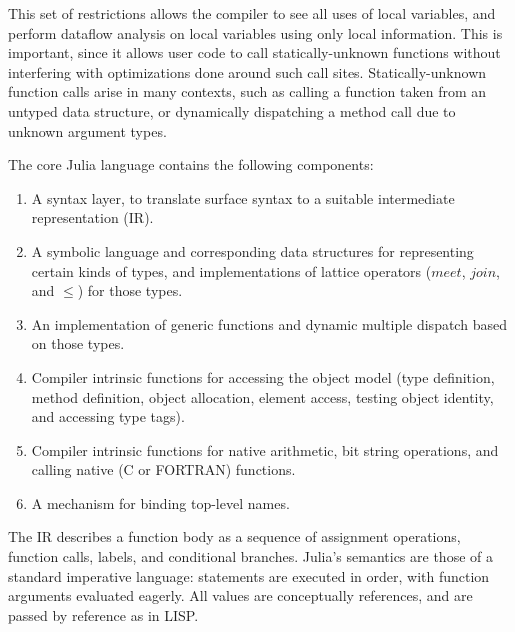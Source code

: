 \documentclass[9pt]{sigplanconf}
\begin{document}
This set of restrictions allows the compiler to see all uses of local
variables, and perform dataflow analysis on local variables using only
local information. This is important, since it allows user code to call
statically-unknown functions without interfering with optimizations done
around such call sites. Statically-unknown function calls arise in
many contexts, such as calling a function taken from an untyped data structure,
or dynamically dispatching a method call due to unknown argument types.

The core Julia language contains the following components:

\begin{enumerate}
\item A syntax layer, to translate surface syntax to a suitable
intermediate representation (IR).
\item A symbolic language and corresponding data structures for representing
certain kinds of types, and implementations of lattice operators ($meet$,
$join$, and $\leq$) for those types.
\item An implementation of generic functions and dynamic multiple dispatch
based on those types.
\item Compiler intrinsic functions for accessing the object model
(type definition, method definition, object allocation, element access,
testing object identity, and accessing type tags).
\item Compiler intrinsic functions for native arithmetic, bit string operations,
and calling native (C or FORTRAN) functions.
\item A mechanism for binding top-level names.
\end{enumerate}

The IR describes a function body as a sequence of assignment operations,
function calls, labels, and conditional branches. Julia's semantics
are those of a standard imperative language: statements are executed in order,
with function arguments evaluated eagerly. All values are conceptually
references, and are passed by reference as in LISP.

\end{document}
